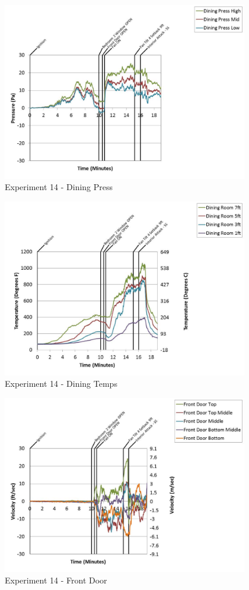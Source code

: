 \documentclass{article}
\begin{document}
\begin{appendices}
	\clearpage

	\begin{figure}[h!]
		\centering
		\includegraphics[height=3.05in]{0_Images/Results_Charts/Exp_14_Charts/DiningPress.pdf}
		\caption{Experiment 14 - Dining Press}
	\end{figure}
 

	\begin{figure}[h!]
		\centering
		\includegraphics[height=3.05in]{0_Images/Results_Charts/Exp_14_Charts/DiningTemps.pdf}
		\caption{Experiment 14 - Dining Temps}
	\end{figure}
 
	\clearpage

	\begin{figure}[h!]
		\centering
		\includegraphics[height=3.05in]{0_Images/Results_Charts/Exp_14_Charts/FrontDoor.pdf}
		\caption{Experiment 14 - Front Door}
	\end{figure}
 


\end{appendices}
\end{document}

